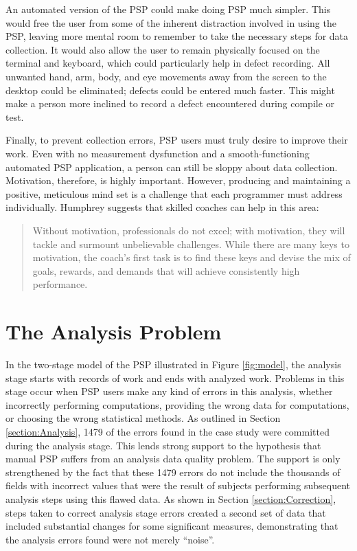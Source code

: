 An automated version of the PSP could make doing PSP much simpler.  This
would free the user from some of the inherent distraction involved in using
the PSP, leaving more mental room to remember to take the necessary steps
for data collection.  It would also allow the user to remain physically
focused on the terminal and keyboard, which could particularly help in
defect recording.  All unwanted hand, arm, body, and eye movements away
from the screen to the desktop could be eliminated; defects could be
entered much faster.  This might make a person more inclined to record a
defect encountered during compile or test.

Finally, to prevent collection errors, PSP users must truly desire to
improve their work. Even with no measurement dysfunction and a
smooth-functioning automated PSP application, a person can still be sloppy
about data collection.  Motivation, therefore, is highly important.
However, producing and maintaining a positive, meticulous mind set is a
challenge that each programmer must address individually.  Humphrey
suggests that skilled coaches can help in this area:
\begin{quote}
  Without motivation, professionals do not excel; with motivation, they
  will tackle and surmount unbelievable challenges.  While there are many
  keys to motivation, the coach's first task is to find these keys and
  devise the mix of goals, rewards, and demands that will achieve
  consistently high performance.
\end{quote}

\section{The Analysis Problem}

In the two-stage model of the PSP illustrated in Figure \ref{fig:model},
the analysis stage starts with records of work and ends with analyzed work.
Problems in this stage occur when PSP users make any kind of errors in this
analysis, whether incorrectly performing computations, providing the wrong
data for computations, or choosing the wrong statistical methods. As
outlined in Section \ref{section:Analysis}, 1479 of the errors found in the
case study were committed during the analysis stage.  This lends strong
support to the hypothesis that manual PSP suffers from an analysis data
quality problem.  The support is only strengthened by the fact that these
1479 errors do not include the thousands of fields with incorrect values
that were the result of subjects performing subsequent analysis steps using
this flawed data.  As shown in Section \ref{section:Correction}, steps
taken to correct analysis stage errors created a second set of data that
included substantial changes for some significant measures, demonstrating
that the analysis errors found were not merely ``noise''.

